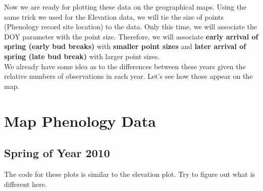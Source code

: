 \documentclass[11pt,twosided]{article}
\begin{document}
Now we are ready for plotting these data on the geographical maps.  Using the same trick we used for the Elevation data, we will tie the size of points (Phenology record site location) to the data.  Only this time, we will associate the DOY parameter with the point size.  Therefore, we will associate {\bf early arrival of spring (early bud breaks)} with {\bf smaller point sizes} and {\bf later arrival of spring (late bud break)} with larger point sizes.  \\

We already have some idea as to the differences between these years given the relative numbers of observations in each year.  Let's see how those appear on the map.\\

\newpage


\section{Map Phenology Data}

\subsection{Spring of Year 2010}

The code for these plots is similar to the elevation plot.  Try to figure out what is different here.\\


\begin{tcolorbox}[breakable,boxrule=0.5pt,enhanced]
\end{tcolorbox}
\vspace{1ex}
\end{document}

